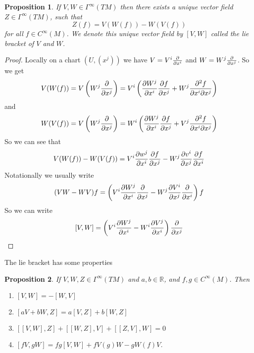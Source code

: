 \documentclass[a4paper]{article}
\newtheorem*{prop}{Proposition}
\begin{document}
\begin{prop}
  If $V,W \in \Gamma^{\infty}(TM)$ then there exists a unique vector field $Z \in \Gamma^{\infty}(TM)$, such that 
  \[
    Z(f) = V(W(f)) - W(V(f))
  \]
  for all $f \in C^{\infty}(M)$. We denote this unique vector field by $[V,W]$ called the lie bracket of $V$ and $W$.
\end{prop}

\begin{proof}
  Locally on a chart $(U, (x^j))$ we have $V = V^i \pdv{}{x^i}$ and $W = W^j\pdv{}{x^j}$. So we get
  \[
    V(W(f)) = V\left(W^j\pdv{}{x^j}\right) = V^i\left(\pdv{W^j}{x^i} \pdv{f}{x^j} + W^j \frac{\partial^2 f}{\partial x^i \partial x^j} \right)
  \]
  and
  \[
    W(V(f)) = V\left(W^j\pdv{}{x^j}\right) = W^i\left(\pdv{W^j}{x^i} \pdv{f}{x^j} + V^j \frac{\partial^2 f}{\partial x^i \partial x^j} \right)
  \]
  So we can see that
  \[
    V(W(f)) - W(V(f)) =  V^i \pdv{w^j}{x^i} \pdv{f}{x^j} - W^j\pdv{v^i}{x^j}\pdv{f}{x^i}
  \]
  Notationally we usually write
  \[
    \begin{aligned}
      (VW - WV)f &= \left(V^i \pdv{W^j}{x^i} \pdv{}{x^j} - W^j \pdv{V^i}{x^j}\pdv{}{x^i} \right)f \\
    \end{aligned}
  \]
  So we can write
  \[
    [V,W] = \left( V^i \pdv{W^j}{x^i} - W^i \pdv{V^j}{x^i} \right) \pdv{}{x^j}
  \]
\end{proof}
The lie bracket has some properties
\begin{prop}
  If $V,W,Z \in \Gamma^{\infty}(TM)$ and $a,b \in \mathds{R}$, and $f,g \in C^{\infty}(M)$. Then
  \begin{enumerate}
    \item $[V,W] = -[W,V]$ 
    \item $[aV + bW, Z] = a[V,Z] + b[W,Z]$
    \item $[[V,W], Z] + [[W,Z],V] + [[Z,V],W] = 0$
    \item $[fV, gW] = fg[V,W] + fV(g)W - gW(f)V$.
  \end{enumerate}
\end{prop}
\end{document}
